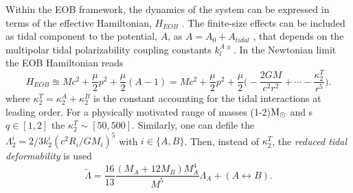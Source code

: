Within the \ac{EOB} framework, the dynamics of the system can be expressed in terms of the 
effective Hamiltonian, $H_{EOB}$
%
.
The finite-size effects can be included as tidal component to the potential, $A$, as 
$A = A_0 + A_{tidal}$ \cite{40}, 
that depends on the multipolar tidal polarizability coupling constants $k_{l}^{A\pm}$.
%
In the Newtonian limit the \ac{EOB} Hamiltonian reads 
%
\begin{equation}
H_{EOB} \approxeq Mc^2 + \frac{\mu}{2}p^2 + \frac{\mu}{2}(A-1) = Mc^2 + \frac{\mu}{2}p^2 + \frac{\mu}{2}\Big( -\frac{2 G M}{c^2 r^2} + \cdots - \frac{\kappa_2^T}{r^5} \Big).
\end{equation}
%
where $\kappa_2^T = \kappa_2^A + \kappa_2^B$ is the constant accounting for the tidal 
interactions at leading order.
%
For a physically motivated range of masses (1-2)${\text{M}_{\odot}}$ and \mr{}s $q\in[1,2]$ the 
$\kappa_2^T\sim[50,500]$. 
%
Similarly, one can defile the $\Lambda_2^i = 2/3 k_2^i (c^2 R_i/GM_i)^5$ with $i\in\{A,B\}$.
Then, instead of $\kappa_2^T$, the \textit{reduced tidal deformability} is used
%
\begin{equation}
\label{eq:theory:Lambda}
\tilde{\Lambda} = \frac{16}{13}\frac{(M_A + 12M_B)M_A^4}{M^5}\Lambda_A + (A\leftrightarrow B).
\end{equation}
%

